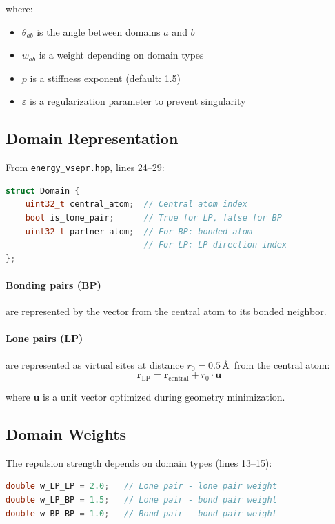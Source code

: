 \documentclass[11pt]{article}
\begin{document}
where:
\begin{itemize}
\item $\theta_{ab}$ is the angle between domains $a$ and $b$
\item $w_{ab}$ is a weight depending on domain types
\item $p$ is a stiffness exponent (default: 1.5)
\item $\varepsilon$ is a regularization parameter to prevent singularity
\end{itemize}

\subsection{Domain Representation}

From \texttt{energy\_vsepr.hpp}, lines 24--29:

\begin{lstlisting}[language=C++]
struct Domain {
    uint32_t central_atom;  // Central atom index
    bool is_lone_pair;      // True for LP, false for BP
    uint32_t partner_atom;  // For BP: bonded atom
                            // For LP: LP direction index
};
\end{lstlisting}

\paragraph{Bonding pairs (BP)} are represented by the vector from the central atom to its bonded neighbor.

\paragraph{Lone pairs (LP)} are represented as virtual sites at distance $r_0 = 0.5$\,\AA\ from the central atom:
\begin{equation}
\mathbf{r}_{\text{LP}} = \mathbf{r}_{\text{central}} + r_0 \cdot \mathbf{u}
\end{equation}

where $\mathbf{u}$ is a unit vector optimized during geometry minimization.

\subsection{Domain Weights}

The repulsion strength depends on domain types (lines 13--15):

\begin{lstlisting}[language=C++]
double w_LP_LP = 2.0;   // Lone pair - lone pair weight
double w_LP_BP = 1.5;   // Lone pair - bond pair weight  
double w_BP_BP = 1.0;   // Bond pair - bond pair weight
\end{lstlisting}
\end{document}

